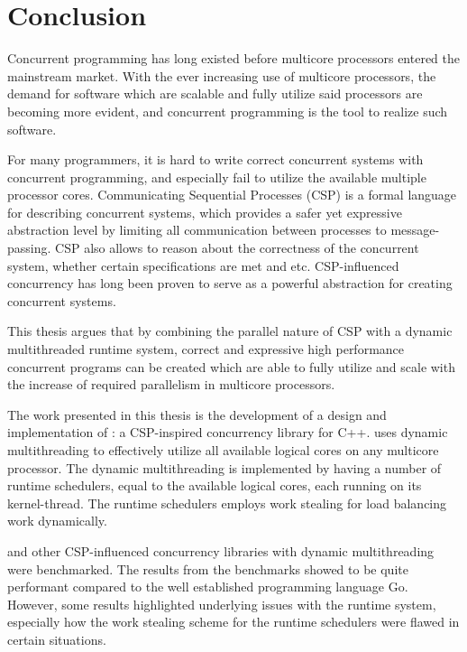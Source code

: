 

\chapter{Conclusion}
\label{ch:conclusion}

Concurrent programming has long existed before multicore processors entered the mainstream market. With the ever increasing use of multicore processors, the demand for software which are scalable and fully utilize said processors are becoming more evident, and concurrent programming is the tool to realize such software.

For many programmers, it is hard to write correct concurrent systems with concurrent programming, and especially fail to utilize the available multiple processor cores. Communicating Sequential Processes (CSP) is a formal language for describing concurrent systems, which provides a safer yet expressive abstraction level by limiting all communication between processes to message\hyp{}passing. CSP also allows to reason about the correctness of the concurrent system, whether certain specifications are met and etc. CSP\hyp{}influenced concurrency has long been proven to serve as a powerful abstraction for creating concurrent systems.

This thesis argues that by combining the parallel nature of CSP with a dynamic multithreaded runtime system, correct and expressive high performance concurrent programs can be created which are able to fully utilize and scale with the increase of required parallelism in multicore processors.

The work presented in this thesis is the development of a design and implementation of \Proxc{}: a CSP\hyp{}inspired concurrency library for C++. \Proxc{} uses dynamic multithreading to effectively utilize all available logical cores on any multicore processor. The dynamic multithreading is implemented by having a number of runtime schedulers, equal to the available logical cores, each running on its kernel\hyp{}thread. The runtime schedulers employs work stealing for load balancing work dynamically. 

\Proxc{} and other CSP\hyp{}influenced concurrency libraries with dynamic multithreading were benchmarked. The results from the benchmarks showed \Proxc{} to be quite performant compared to the well established programming language Go. However, some results highlighted underlying issues with the runtime system, especially how the work stealing scheme for the runtime schedulers were flawed in certain situations.

